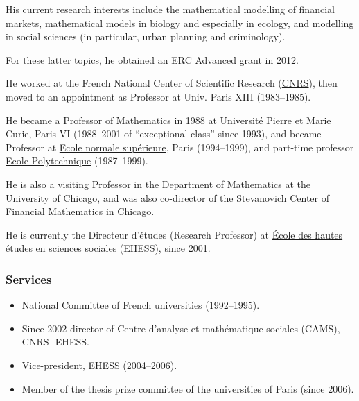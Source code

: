 \documentclass{article}
\begin{document}
His current research interests include the mathematical modelling of financial markets, mathematical models in biology and especially in ecology, and modelling in social sciences (in particular, urban planning and criminology).

For these latter topics, he obtained an \href{http://erc.europa.eu/advanced-grants}{ERC Advanced grant} in 2012.

%
He worked at the French National Center of Scientific Research (\href{https://en.wikipedia.org/wiki/CNRS}{CNRS}), then moved to an appointment as Professor at Univ. Paris XIII (1983--1985).

He became a Professor of Mathematics in 1988 at Université Pierre et Marie Curie, Paris VI (1988--2001 of ``exceptional class'' since 1993), and became Professor at \href{https://en.wikipedia.org/wiki/Ecole_normale_sup%C3%A9rieure}{Ecole normale supérieure}, Paris (1994--1999), and part-time professor \href{https://en.wikipedia.org/wiki/Ecole_Polytechnique}{Ecole Polytechnique} (1987--1999).

He is also a visiting Professor in the Department of Mathematics at the University of Chicago, and was also co-director of the Stevanovich Center of Financial Mathematics in Chicago.

He is currently the Directeur d'études (Research Professor) at \href{https://en.wikipedia.org/wiki/School_for_Advanced_Studies_in_the_Social_Sciences}{École des hautes études en sciences sociales} (\href{https://en.wikipedia.org/wiki/EHESS}{EHESS}), since 2001.

\subsubsection{Services}
\begin{itemize}
	\item National Committee of French universities (1992--1995).
	\item Since 2002 director of Centre d'analyse et mathématique sociales (CAMS), CNRS -EHESS.
	\item Vice-president, EHESS (2004--2006).
	\item Member of the thesis prize committee of the universities of Paris (since 2006).
\end{itemize}
\end{document}
